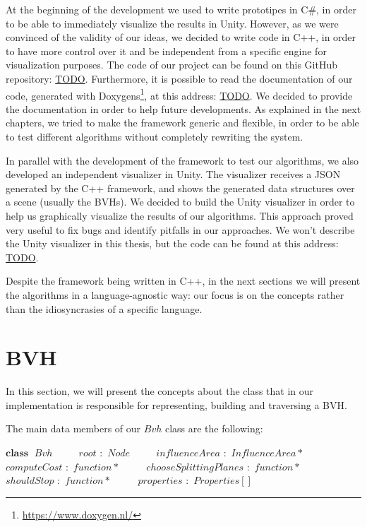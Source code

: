 \documentclass{PoliMi_MasterThesis}
\newcommand*\Class[1]{\State $\textbf{class} \;$ #1}
\newcommand*\Member[2]{\State $\qquad$ #1 $:$ #2}
\begin{document}
At the beginning of the development we used to write prototipes in C\#, in order to be able to immediately visualize the results in Unity. However, as we were convinced of the validity of our ideas, we decided to write code in C++, in order to have more control over it and be independent from a specific engine for visualization purposes. The code of our project can be found on this GitHub repository: \url{TODO}. Furthermore, it is possible to read the documentation of our code, generated with Doxygens\footnote{\url{https://www.doxygen.nl/}}, at this address: \url{TODO}. We decided to provide the documentation in order to help future developments. As explained in the next chapters, we tried to make the framework generic and flexible, in order to be able to test different algorithms without completely rewriting the system.

In parallel with the development of the framework to test our algorithms, we also developed an independent visualizer in Unity. The visualizer receives a JSON generated by the C++ framework, and shows the generated data structures over a scene (usually the BVHs). We decided to build the Unity visualizer in order to help us graphically visualize the results of our algorithms. This approach proved very useful to fix bugs and identify pitfalls in our approaches. We won't describe the Unity visualizer in this thesis, but the code can be found at this address: \url{TODO}.

Despite the framework being written in C++, in the next sections we will present the algorithms in a language-agnostic way: our focus is on the concepts rather than the idiosyncrasies of a specific language.

\section{BVH} \label{sec:bvh}
In this section, we will present the concepts about the class that in our implementation is responsible for representing, building and traversing a BVH.

The main data members of our $Bvh$ class are the following:
\begin{algorithm}[H]
	\begin{algorithmic}
		\Class{$Bvh$}
		\Member{$root$}{$Node$}
		\Member{$influenceArea$}{$InfluenceArea*$}
		\Member{$computeCost$}{$function*$}
		\Member{$chooseSplittingPlanes$}{$function*$}
		\Member{$shouldStop$}{$function*$}
		\Member{$properties$}{$Properties[]$}
	\end{algorithmic}
\end{algorithm} 
\end{document}
